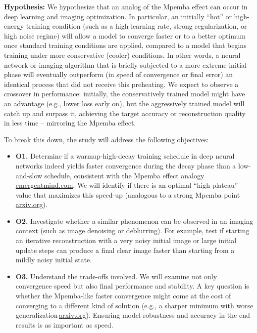 \documentclass[11pt]{article}
\begin{document}
\textbf{Hypothesis:} We hypothesize that an analog of the Mpemba effect can occur in deep learning and imaging optimization. In particular, an initially ``hot'' or high-energy training condition (such as a high learning rate, strong regularization, or high noise regime) will allow a model to converge faster or to a better optimum once standard training conditions are applied, compared to a model that begins training under more conservative (cooler) conditions. In other words, a neural network or imaging algorithm that is briefly subjected to a more extreme initial phase will eventually outperform (in speed of convergence or final error) an identical process that did not receive this preheating. We expect to observe a crossover in performance: initially, the conservatively trained model might have an advantage (e.g., lower loss early on), but the aggressively trained model will catch up and surpass it, achieving the target accuracy or reconstruction quality in less time -- mirroring the Mpemba effect.

To break this down, the study will address the following objectives:

\begin{itemize}
  \item \textbf{O1.} Determine if a warmup-high-decay training schedule in deep neural networks indeed yields faster convergence during the decay phase than a low-and-slow schedule, consistent with the Mpemba effect analogy\,\href{https://www.emergentmind.com/topics/warmup-stable-decay-wsd-schedules#:~:text=Notably%2C the greatest loss reduction,May 2025 %2C  25}{emergentmind.com}. We will identify if there is an optimal ``high plateau'' value that maximizes this speed-up (analogous to a strong Mpemba point\,\href{https://arxiv.org/html/2507.04206v1#:~:text=Mpemba effect—a phenomenon in which,We derive analytical conditions for}{arxiv.org}).
  \item \textbf{O2.} Investigate whether a similar phenomenon can be observed in an imaging context (such as image denoising or deblurring). For example, test if starting an iterative reconstruction with a very noisy initial image or large initial update steps can produce a final clear image faster than starting from a mildly noisy initial state.
  \item \textbf{O3.} Understand the trade-offs involved. We will examine not only convergence speed but also final performance and stability. A key question is whether the Mpemba-like faster convergence might come at the cost of converging to a different kind of solution (e.g., a sharper minimum with worse generalization\,\href{https://arxiv.org/html/2507.04206v1#:~:text=Generalization vs,bias training toward sharper minima}{arxiv.org}). Ensuring model robustness and accuracy in the end results is as important as speed.
\end{itemize}
\end{document}
